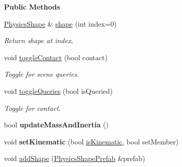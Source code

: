 \begin{Indent}\textbf{ Public Methods}\par
\begin{DoxyCompactItemize}
\item 
\mbox{\label{classrev_1_1_rigid_body_a9806bd3ece163a62e1b5c57010df9817}} 
\mbox{\hyperlink{classrev_1_1_physics_shape}{Physics\+Shape}} \& \mbox{\hyperlink{classrev_1_1_rigid_body_a9806bd3ece163a62e1b5c57010df9817}{shape}} (int index=0)
\begin{DoxyCompactList}\small\item\em Return shape at index. \end{DoxyCompactList}\item 
\mbox{\label{classrev_1_1_rigid_body_aff94accc447f1b6f63ff8fdab2a44faf}} 
void \mbox{\hyperlink{classrev_1_1_rigid_body_aff94accc447f1b6f63ff8fdab2a44faf}{toggle\+Contact}} (bool contact)
\begin{DoxyCompactList}\small\item\em Toggle for scene queries. \end{DoxyCompactList}\item 
\mbox{\label{classrev_1_1_rigid_body_afb5be1d929a7a2a288b90d8fdebf4aef}} 
void \mbox{\hyperlink{classrev_1_1_rigid_body_afb5be1d929a7a2a288b90d8fdebf4aef}{toggle\+Queries}} (bool is\+Queried)
\begin{DoxyCompactList}\small\item\em Toggle for contact. \end{DoxyCompactList}\item 
\mbox{\label{classrev_1_1_rigid_body_a6b5c8def5d0e7310c17b2bc731c25c8a}} 
bool {\bfseries update\+Mass\+And\+Inertia} ()
\item 
\mbox{\label{classrev_1_1_rigid_body_a7db3a12bb0dedb2eb8df64b2ed1c4882}} 
void {\bfseries set\+Kinematic} (bool \mbox{\hyperlink{classrev_1_1_rigid_body_aa06d967f38f53d8785b28c5ac5b338e3}{is\+Kinematic}}, bool set\+Member)
\item 
\mbox{\label{classrev_1_1_rigid_body_ae2dd024bd1cfdc71aa950c8a9b973c79}} 
void \mbox{\hyperlink{classrev_1_1_rigid_body_ae2dd024bd1cfdc71aa950c8a9b973c79}{add\+Shape}} (\mbox{\hyperlink{classrev_1_1_physics_shape_prefab}{Physics\+Shape\+Prefab}} \&prefab)

\end{DoxyCompactItemize}
\end{Indent}
